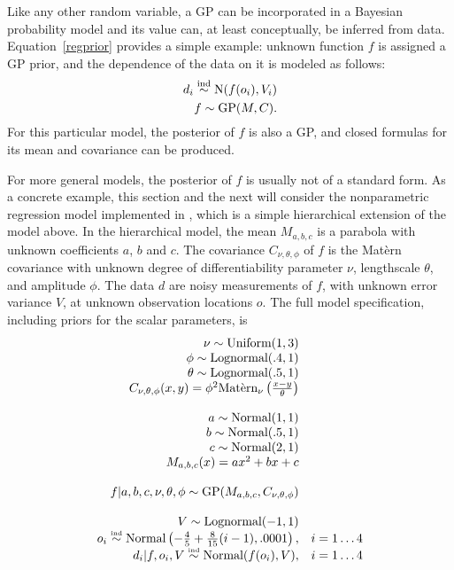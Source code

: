 \documentclass[article]{jss}
\begin{document}
Like any other random variable, a GP can be incorporated in a Bayesian probability model and its value can, at least conceptually, be inferred from data. Equation~\ref{regprior} provides a simple example: unknown function $f$ is assigned a GP prior, and the dependence of the data on it is modeled as follows:
\begin{eqnarray*}
    d_i \stackrel{\tiny{\textup{ind}}} {\sim} \textup{N}(f(o_i), V_i)\\
    f \sim \textup{GP}(M,C).
\end{eqnarray*}
For this particular model, the posterior of $f$ is also a GP, and closed formulas for its mean and covariance can be produced.

For more general models, the posterior of $f$ is usually not of a standard form. As a concrete example, this section and the next will consider the nonparametric regression model implemented in , which is a simple hierarchical extension of the model above. In the hierarchical model, the mean $M_{a,b,c}$ is a parabola with unknown coefficients $a$, $b$ and $c$. The covariance $C_{\nu,\theta,\phi}$ of $f$ is the Mat\`ern covariance with unknown degree of differentiability parameter $\nu$, lengthscale $\theta$, and amplitude $\phi$. The data $d$ are noisy measurements of $f$, with unknown error variance $V$, at unknown observation locations $o$. The full model specification, including priors for the scalar parameters, is
\begin{equation}
    \label{eq:simple-example-model} 
    \begin{array}{rr}
    \nu\sim\textup{Uniform}(1,3)&\\
    \phi\sim\textup{Lognormal}(.4,1)&\\
    \theta\sim\textup{Lognormal}(.5,1)&\\
    C_{\nu,\theta,\phi}(x,y) = \phi^2\textup{Mat\`ern}_\nu\left( \frac{x-y}{\theta} \right)&\\
    &\\
    a\sim\textup{Normal}(1,1)&\\
    b\sim\textup{Normal}(.5,1)&\\
    c\sim\textup{Normal}(2,1)&\\
    M_{a,b,c}(x) = ax^2+bx+c&\\
    &\\
    f|a,b,c,\nu,\theta,\phi\sim\textup{GP}(M_{a,b,c}, C_{\nu,\theta,\phi})&\\
    &\\
    V\sim\textup{Lognormal}(-1,1)&\\
    o_i \stackrel{\textup{\tiny ind}}{\sim} \textup{Normal}\left(-\frac{4}{5}+\frac{8}{15}(i-1), .0001\right),&i=1\ldots 4\\
    d_i|f,o_i,V \stackrel{\textup{\tiny ind}}{\sim} \textup{Normal}(f(o_i),V),& i=1\ldots 4
        \end{array}
\end{equation}
\end{document}
